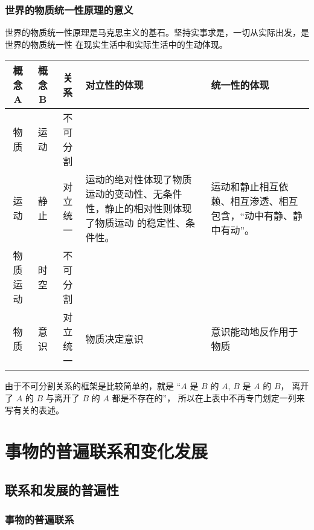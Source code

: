 \documentclass[utf-8, 10pt]{article}
\begin{document}
\subsubsection{世界的物质统一性原理的意义}

世界的物质统一性原理是马克思主义的基石。坚持实事求是，一切从实际出发，是世界的物质统一性
在现实生活中和实际生活中的生动体现。

{
    \label{两个概念的关系的问题} %
    \begin{longtable}{cc|c p{} p{}}
        \hline
        \textbf{概念 A} & \textbf{概念 B} & \textbf{关系} & \textbf{对立性的体现} & \textbf{统一性的体现} \\ 
        \hline
        \endhead
        \hline
        \endfoot

        物质 & 运动 & 不可分割 \\ 
        \hline
        运动 & 静止 & 对立统一 & 运动的绝对性体现了物质运动的变动性、无条件性，静止的相对性则体现了物质运动
        的稳定性、条件性。 & 运动和静止相互依赖、相互渗透、相互包含，“动中有静、静中有动”。 \\
        \hline
        物质运动 & 时空 & 不可分割 \\
        \hline
        物质 & 意识 & 对立统一
        & 物质决定意识 
        & 意识能动地反作用于物质 \\
    \end{longtable}
    \begin{remark}
        由于不可分割关系的框架是比较简单的，就是 “$A$ 是 $B$ 的 $A$, $B$ 是 $A$ 的 $B$，
        离开了 $A$ 的 $B$ 与离开了 $B$ 的 $A$ 都是不存在的”，
        所以在上表中不再专门划定一列来写有关的表述。
    \end{remark}
}

\section{事物的普遍联系和变化发展}

\subsection{联系和发展的普遍性}

\subsubsection{事物的普遍联系}
\end{document}
